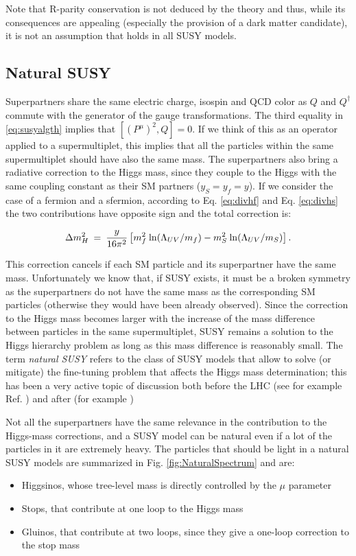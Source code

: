Note that R-parity conservation is not deduced by the theory and thus, while its consequences are appealing (especially the provision of a dark matter candidate), it is not an assumption that holds in all SUSY models.



\subsection{Natural SUSY}

Superpartners share the same electric charge, isospin and QCD color as $Q$ and $Q^\dagger$ commute with the generator of the gauge transformations.
The third equality in \ref{eq:susyalgth} implies that $[ (P^\mu)^2 , Q  ]=0$. If we think of this as an operator applied to a supermultiplet, this implies that all the particles within the same supermultiplet should have also the same mass. The superpartners also bring a radiative correction to the Higgs mass, since they couple to the Higgs with the same coupling constant as their SM partners ($y_S=y_f=y$). If we consider the case of a fermion and a sfermion, according to Eq. \ref{eq:divhf} and Eq. \ref{eq:divhs} the two contributions have opposite sign and the total correction is:

\begin{equation}
\Delta m_H^2 \>=\> {y\over 16 \pi^2}
\left [ m_f^2
\> {\rm ln}(\Lambda_{UV}/m_f) 
- m_S^2
\> {\rm ln}(\Lambda_{UV}/m_S) 
\right ].
\label{eq:divhsusy}
\end{equation}

This correction cancels if each SM particle and its superpartner have the same mass. Unfortunately we know that, if SUSY exists, it must be a broken symmetry as the superpartners do not have the same mass as the corresponding SM particles (otherwise they would have been already observed). Since the correction to the Higgs mass becomes larger with the increase of the mass difference between particles in the same supermultiplet, SUSY remains a solution to the Higgs hierarchy problem as long as this mass difference is reasonably small. The term \textit{natural SUSY} refers to the class of SUSY models that allow to solve (or mitigate) the fine-tuning problem that affects the Higgs mass determination; this has been a very active topic of discussion both before the LHC (see for example Ref. \cite{BARBIERI198863}\cite{Dimopoulos:1995mi}) and after (for example \cite{Papucci:2011wy}\cite{Casas:2014eca}) 

Not all the superpartners have the same relevance in the contribution to the Higgs-mass corrections, and a SUSY model can be natural even if a lot of the particles in it are extremely heavy. The particles that should be light in a natural SUSY models are summarized in Fig. \ref{fig:NaturalSpectrum} and are:
\begin{itemize}
\item Higgsinos, whose tree-level mass is directly controlled by the $\mu$ parameter
\item Stops, that contribute at one loop to the Higgs mass
\item Gluinos, that contribute at two loops, since they give a one-loop correction to the stop mass
\end{itemize}


